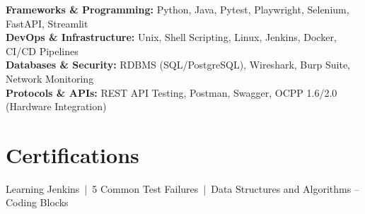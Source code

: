 \documentclass[a4paper,10pt]{article}
\begin{document}
\textbf{Frameworks \& Programming:} Python, Java, Pytest, Playwright, Selenium, FastAPI, Streamlit\\
\textbf{DevOps \& Infrastructure:} Unix, Shell Scripting, Linux, Jenkins, Docker, CI/CD Pipelines\\
\textbf{Databases \& Security:} RDBMS (SQL/PostgreSQL), Wireshark, Burp Suite, Network Monitoring\\
\textbf{Protocols \& APIs:} REST API Testing, Postman, Swagger, OCPP 1.6/2.0 (Hardware Integration)

\section{Certifications}
Learning Jenkins \,|\, 5 Common Test Failures \,|\, Data Structures and Algorithms – Coding Blocks
\end{document}

